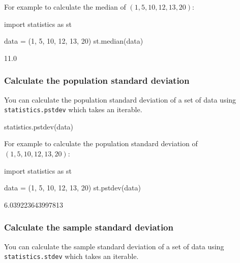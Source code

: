 For example to calculate the median of \((1, 5, 10, 12, 13, 20)\):




\begin{pyin}
import statistics as st

data = (1, 5, 10, 12, 13, 20)
st.median(data)
\end{pyin}





\begin{raw}
11.0
\end{raw}





\subsubsection{Calculate the population standard deviation}
\label{\detokenize{tools-for-mathematics/08-statistics/how/main:calculate-the-population-standard-deviation}}

You can calculate the population standard deviation of a set of data using \texttt{statistics.pstdev} which takes an
iterable.


\begin{api}
statistics.pstdev(data)
\end{api}



For example to calculate the population standard deviation of \((1, 5, 10, 12, 13, 20)\):




\begin{pyin}
import statistics as st

data = (1, 5, 10, 12, 13, 20)
st.pstdev(data)
\end{pyin}





\begin{raw}
6.039223643997813
\end{raw}





\subsubsection{Calculate the sample standard deviation}
\label{\detokenize{tools-for-mathematics/08-statistics/how/main:calculate-the-sample-standard-deviation}}

You can calculate the sample standard deviation of a set of data using \texttt{statistics.stdev} which takes an
iterable.


